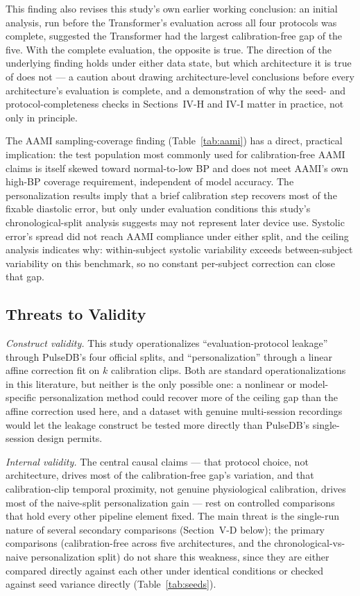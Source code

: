 \documentclass[journal]{IEEEtran}
\begin{document}
This finding also revises this study's own earlier working conclusion: an initial analysis, run before the Transformer's evaluation across all four protocols was complete, suggested the Transformer had the largest calibration-free gap of the five. With the complete evaluation, the opposite is true. The direction of the underlying finding holds under either data state, but which architecture it is true of does not --- a caution about drawing architecture-level conclusions before every architecture's evaluation is complete, and a demonstration of why the seed- and protocol-completeness checks in Sections~IV-H and IV-I matter in practice, not only in principle.

The AAMI sampling-coverage finding (Table~\ref{tab:aami}) has a direct, practical implication: the test population most commonly used for calibration-free AAMI claims is itself skewed toward normal-to-low BP and does not meet AAMI's own high-BP coverage requirement, independent of model accuracy. The personalization results imply that a brief calibration step recovers most of the fixable diastolic error, but only under evaluation conditions this study's chronological-split analysis suggests may not represent later device use. Systolic error's spread did not reach AAMI compliance under either split, and the ceiling analysis indicates why: within-subject systolic variability exceeds between-subject variability on this benchmark, so no constant per-subject correction can close that gap.

\subsection{Threats to Validity}
\textit{Construct validity.} This study operationalizes ``evaluation-protocol leakage'' through PulseDB's four official splits, and ``personalization'' through a linear affine correction fit on $k$ calibration clips. Both are standard operationalizations in this literature, but neither is the only possible one: a nonlinear or model-specific personalization method could recover more of the ceiling gap than the affine correction used here, and a dataset with genuine multi-session recordings would let the leakage construct be tested more directly than PulseDB's single-session design permits.

\textit{Internal validity.} The central causal claims --- that protocol choice, not architecture, drives most of the calibration-free gap's variation, and that calibration-clip temporal proximity, not genuine physiological calibration, drives most of the naive-split personalization gain --- rest on controlled comparisons that hold every other pipeline element fixed. The main threat is the single-run nature of several secondary comparisons (Section~V-D below); the primary comparisons (calibration-free across five architectures, and the chronological-vs-naive personalization split) do not share this weakness, since they are either compared directly against each other under identical conditions or checked against seed variance directly (Table~\ref{tab:seeds}).
\end{document}
